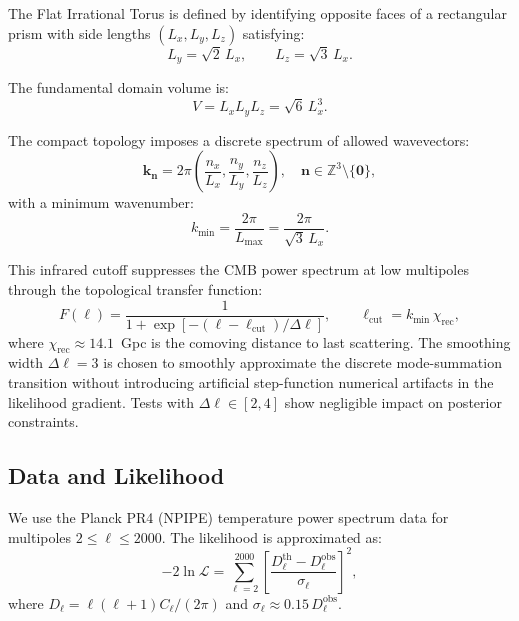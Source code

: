 \documentclass[a4paper,11pt]{article}
\begin{document}
The Flat Irrational Torus is defined by identifying opposite faces of a rectangular prism with side lengths $(L_x, L_y, L_z)$ satisfying:
\begin{equation}
    L_y = \sqrt{2} \, L_x, \qquad L_z = \sqrt{3} \, L_x.
\end{equation}

The fundamental domain volume is:
\begin{equation}
    V = L_x L_y L_z = \sqrt{6} \, L_x^3.
\end{equation}

The compact topology imposes a discrete spectrum of allowed wavevectors:
\begin{equation}
    \mathbf{k}_{\mathbf{n}} = 2\pi \left( \frac{n_x}{L_x}, \frac{n_y}{L_y}, \frac{n_z}{L_z} \right), \quad \mathbf{n} \in \mathbb{Z}^3 \setminus \{\mathbf{0}\},
\end{equation}
with a minimum wavenumber:
\begin{equation}
    k_{\min} = \frac{2\pi}{L_{\max}} = \frac{2\pi}{\sqrt{3} \, L_x}.
\end{equation}

This infrared cutoff suppresses the CMB power spectrum at low multipoles through the topological transfer function:
\begin{equation}
    F(\ell) = \frac{1}{1 + \exp\left[-(\ell - \ell_{\text{cut}})/\Delta\ell\right]}, 
    \qquad \ell_{\text{cut}} = k_{\min} \, \chi_{\text{rec}},
\end{equation}
where $\chi_{\text{rec}} \approx 14.1$~Gpc is the comoving distance to last scattering. 
The smoothing width $\Delta\ell=3$ is chosen to smoothly approximate the discrete mode-summation transition without introducing artificial step-function numerical artifacts in the likelihood gradient. Tests with $\Delta\ell \in [2,4]$ show negligible impact on posterior constraints.

\subsection{Data and Likelihood}

We use the Planck PR4 (NPIPE) temperature power spectrum data \citep{Planck2020_NPIPE} for multipoles $2 \leq \ell \leq 2000$. The likelihood is approximated as:
\begin{equation}
    -2\ln\mathcal{L} = \sum_{\ell=2}^{2000} \left[ \frac{D_\ell^{\text{th}} - D_\ell^{\text{obs}}}{\sigma_\ell} \right]^2,
\end{equation}
where $D_\ell = \ell(\ell+1)C_\ell/(2\pi)$ and $\sigma_\ell \approx 0.15 \, D_\ell^{\text{obs}}$.
\end{document}
